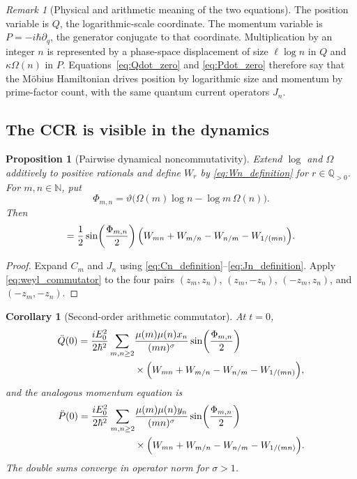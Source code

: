 \documentclass[11pt]{amsart}
\numberwithin{equation}{section}
\theoremstyle{plain}
\newtheorem{proposition}[theorem]{Proposition}
\newtheorem{corollary}[theorem]{Corollary}
\theoremstyle{definition}
\theoremstyle{remark}
\newtheorem{remark}[theorem]{Remark}
\newcommand{\N}{\mathbb{N}}
\newcommand{\Qp}{\mathbb{Q}_{>0}}
\newcommand{\Om}{\Omega}
\begin{document}
\begin{remark}[Physical and arithmetic meaning of the two equations]
\label{rem:meaning_equations_motion}
The position variable is $Q$, the logarithmic-scale coordinate.  The
momentum variable is $P=-i\hbar\partial_q$, the generator conjugate to that
coordinate.  Multiplication by an integer $n$ is represented by a phase-space
displacement of size $\ell\log n$ in $Q$ and $\kappa\Om(n)$ in $P$.
Equations~\eqref{eq:Qdot_zero} and \eqref{eq:Pdot_zero} therefore say that
the M\"obius Hamiltonian drives position by logarithmic size and momentum by
prime-factor count, with the same quantum current operators $J_n$.
\end{remark}

\subsection{The CCR is visible in the dynamics}
\label{subsec:CCR_in_dynamics}

\begin{proposition}[Pairwise dynamical noncommutativity]
\label{prop:CJ_commutator}
Extend $\log$ and $\Om$ additively to positive rationals and define $W_r$ by
\eqref{eq:Wn_definition} for $r\in\Qp$.  For $m,n\in\N$, put
\begin{equation}
\Phi_{m,n}
=
\vartheta\bigl(\Om(m)\log n-\log m\,\Om(n)\bigr).
\label{eq:Phi_mn}
\end{equation}
Then
\begin{align}
[C_m,J_n]
=
\frac12\sin\!\left(\frac{\Phi_{m,n}}{2}\right)
\Bigl(
W_{mn}+W_{m/n}-W_{n/m}-W_{1/(mn)}
\Bigr).
\label{eq:Cm_Jn_commutator}
\end{align}
\end{proposition}

\begin{proof}
Expand $C_m$ and $J_n$ using
\eqref{eq:Cn_definition}--\eqref{eq:Jn_definition}.  Apply
\eqref{eq:weyl_commutator} to the four pairs
$(z_m,z_n)$, $(z_m,-z_n)$, $(-z_m,z_n)$, and $(-z_m,-z_n)$.
\end{proof}

\begin{corollary}[Second-order arithmetic commutator]
\label{cor:second_order_force}
At $t=0$,
\begin{align}
\ddot Q(0)
=
\frac{iE_0^2}{2\hbar^2}
\sum_{m,n\ge2}
&\frac{\mu(m)\mu(n)x_n}{(mn)^{\sigma}}
\sin\!\left(\frac{\Phi_{m,n}}{2}\right)
\notag\\
&\times
\Bigl(
W_{mn}+W_{m/n}-W_{n/m}-W_{1/(mn)}
\Bigr),
\label{eq:Q_second_derivative}
\end{align}
and the analogous momentum equation is
\begin{align}
\ddot P(0)
=
\frac{iE_0^2}{2\hbar^2}
\sum_{m,n\ge2}
&\frac{\mu(m)\mu(n)y_n}{(mn)^{\sigma}}
\sin\!\left(\frac{\Phi_{m,n}}{2}\right)
\notag\\
&\times
\Bigl(
W_{mn}+W_{m/n}-W_{n/m}-W_{1/(mn)}
\Bigr).
\label{eq:P_second_derivative}
\end{align}
The double sums converge in operator norm for $\sigma>1$.
\end{corollary}
\end{document}
